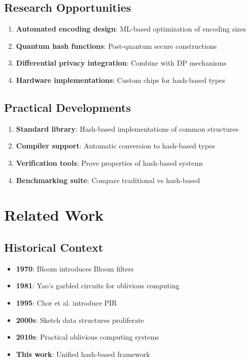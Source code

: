\documentclass[11pt,final,hidelinks]{article}
\begin{document}
\subsection{Research Opportunities}

\begin{enumerate}
    \item \textbf{Automated encoding design}: ML-based optimization of encoding sizes
    \item \textbf{Quantum hash functions}: Post-quantum secure constructions
    \item \textbf{Differential privacy integration}: Combine with DP mechanisms
    \item \textbf{Hardware implementations}: Custom chips for hash-based types
\end{enumerate}

\subsection{Practical Developments}

\begin{enumerate}
    \item \textbf{Standard library}: Hash-based implementations of common structures
    \item \textbf{Compiler support}: Automatic conversion to hash-based types
    \item \textbf{Verification tools}: Prove properties of hash-based systems
    \item \textbf{Benchmarking suite}: Compare traditional vs hash-based
\end{enumerate}

\section{Related Work}

\subsection{Historical Context}

\begin{itemize}
    \item \textbf{1970}: Bloom introduces Bloom filters
    \item \textbf{1981}: Yao's garbled circuits for oblivious computing
    \item \textbf{1995}: Chor et al. introduce PIR
    \item \textbf{2000s}: Sketch data structures proliferate
    \item \textbf{2010s}: Practical oblivious computing systems
    \item \textbf{This work}: Unified hash-based framework
\end{itemize}
\end{document}
